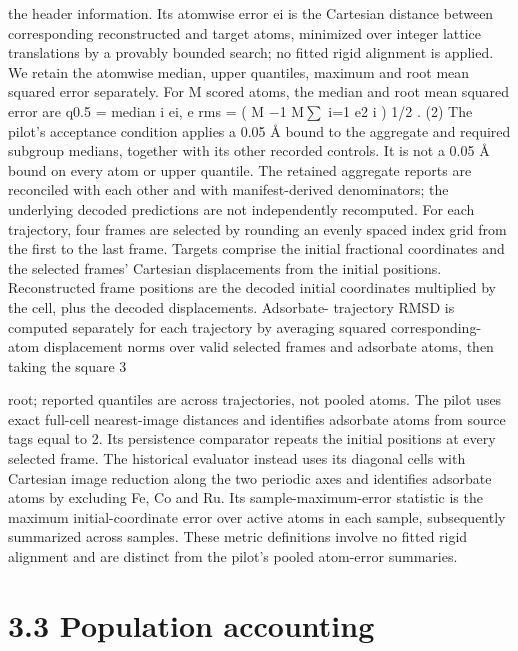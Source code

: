 \documentclass[11pt]{article}
\begin{document}
the header information. Its atomwise error ei is the Cartesian distance between corresponding
reconstructed and target atoms, minimized over integer lattice translations by a provably bounded
search; no fitted rigid alignment is applied. We retain the atomwise median, upper quantiles,
maximum and root mean squared error separately. For M scored atoms, the median and root
mean squared error are
q0.5 = median i ei, e rms =
(
M \ensuremath{-}1
M\ensuremath{\sum}
i=1
e2
i
) 1/2
. (2)
The pilot’s acceptance condition applies a 0.05 Å bound to the aggregate and required subgroup
medians, together with its other recorded controls. It is not a 0.05 Å bound on every atom or upper
quantile. The retained aggregate reports are reconciled with each other and with manifest-derived
denominators; the underlying decoded predictions are not independently recomputed.
For each trajectory, four frames are selected by rounding an evenly spaced index grid from
the first to the last frame. Targets comprise the initial fractional coordinates and the selected
frames’ Cartesian displacements from the initial positions. Reconstructed frame positions are the
decoded initial coordinates multiplied by the cell, plus the decoded displacements. Adsorbate-
trajectory RMSD is computed separately for each trajectory by averaging squared corresponding-
atom displacement norms over valid selected frames and adsorbate atoms, then taking the square
3

root; reported quantiles are across trajectories, not pooled atoms. The pilot uses exact full-cell
nearest-image distances and identifies adsorbate atoms from source tags equal to 2. Its persistence
comparator repeats the initial positions at every selected frame. The historical evaluator instead
uses its diagonal cells with Cartesian image reduction along the two periodic axes and identifies
adsorbate atoms by excluding Fe, Co and Ru. Its sample-maximum-error statistic is the maximum
initial-coordinate error over active atoms in each sample, subsequently summarized across samples.
These metric definitions involve no fitted rigid alignment and are distinct from the pilot’s pooled
atom-error summaries.

\section*{3.3 Population accounting}
\end{document}
